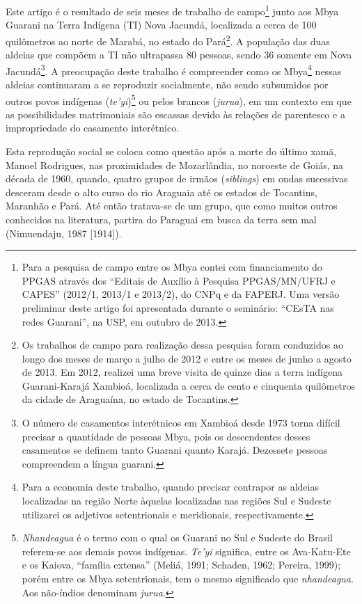 Este artigo é o resultado de seis meses de trabalho de campo\footnote{Para
  a pesquisa de campo entre os Mbya contei com financiamento do PPGAS
  através dos ``Editais de Auxílio à Pesquisa PPGAS/MN/UFRJ e CAPES''
  (2012/1, 2013/1 e 2013/2), do CNPq e da FAPERJ. Uma versão preliminar
  deste artigo foi apresentada durante o seminário: ``CEsTA nas redes
  Guarani'', na USP, em outubro de 2013.} junto aos Mbya Guarani na
Terra Indígena (TI) Nova Jacundá, localizada a cerca de 100 quilômetros
ao norte de Marabá, no estado do Pará\footnote{Os trabalhos de campo
  para realização dessa pesquisa foram conduzidos ao longo dos meses de
  março a julho de 2012 e entre os meses de junho a agosto de 2013. Em
  2012, realizei uma breve visita de quinze dias a terra indígena
  Guarani-Karajá Xambioá, localizada a cerca de cento e cinquenta
  quilômetros da cidade de Araguaína, no estado de Tocantins.}. A
população das duas aldeias que compõem a TI não ultrapassa 80 pessoas,
sendo 36 somente em Nova Jacundá\footnote{O número de casamentos
  interétnicos em Xambioá desde 1973 torna difícil precisar a quantidade
  de pessoas Mbya, pois os descendentes desses casamentos se definem
  tanto Guarani quanto Karajá. Dezessete pessoas compreendem a língua
  guarani.}. A preocupação deste trabalho é compreender como os
Mbya\footnote{Para a economia deste trabalho, quando precisar contrapor
  as aldeias localizadas na região Norte àquelas localizadas nas regiões
  Sul e Sudeste utilizarei os adjetivos setentrionais e meridionais,
  respectivamente.} nessas aldeias continuaram a se reproduzir
socialmente, não sendo subsumidos por outros povos indígenas
(\emph{te'yi})\footnote{\emph{Nhandeagua} é o termo com o qual os
  Guarani no Sul e Sudeste do Brasil referem-se aos demais povos
  indígenas. \emph{Te'yi} significa, entre os Ava-Katu-Ete e os Kaiova,
  ``família extensa'' (Meliá, 1991; Schaden, 1962; Pereira, 1999); porém
  entre os Mbya setentrionais, tem o mesmo significado que
  \emph{nhandeagua}. Aos não-índios denominam \emph{jurua}.} ou pelos
brancos (\emph{jurua}), em um contexto em que as possibilidades
matrimoniais são escassas devido às relações de parentesco e a
impropriedade do casamento interétnico.

Esta reprodução social se coloca como questão após a morte do último
xamã, Manoel Rodrigues, nas proximidades de Mozarlândia, no noroeste de
Goiás, na década de 1960, quando, quatro grupos de irmãos
(\emph{siblings}) em ondas sucessivas desceram desde o alto curso do rio
Araguaia até os estados de Tocantins, Maranhão e Pará. Até então
tratava-se de um grupo, que como muitos outros conhecidos na literatura,
partira do Paraguai em busca da terra sem mal (Nimuendaju, 1987
{[}1914{]}).

